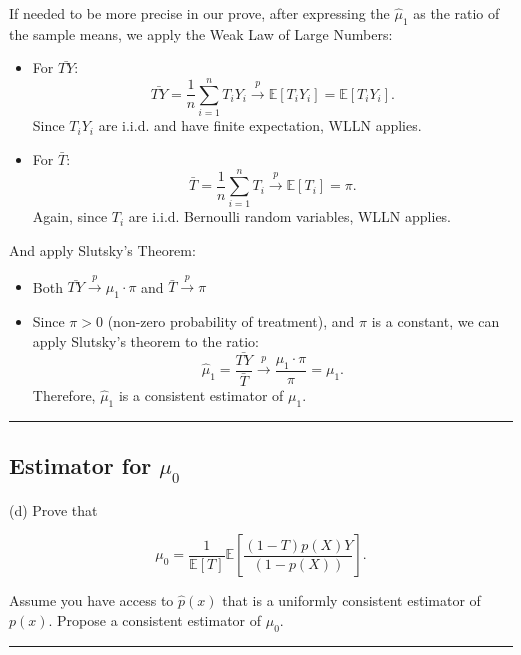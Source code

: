 \documentclass{article}
\newenvironment{colorparagraph}[1]{\par\color{#1}}{\par}
\begin{document}
If needed to be more precise in our prove, after expressing the $\hat{\mu}_1$ as the ratio of the sample means, we apply the Weak Law of Large Numbers:

\begin{itemize}
    \item For \(\bar{T Y}\):
    \[
    \bar{T Y} = \frac{1}{n} \sum_{i=1}^n T_i Y_i \xrightarrow{p} \mathbb{E}[T_i Y_i] = \mathbb{E}[T_i Y_i].
    \]
    Since \(T_i Y_i\) are i.i.d. and have finite expectation, WLLN applies.
    \item For \(\bar{T}\):
    \[
    \bar{T} = \frac{1}{n} \sum_{i=1}^n T_i \xrightarrow{p} \mathbb{E}[T_i] = \pi.
    \]
    Again, since \(T_i\) are i.i.d. Bernoulli random variables, WLLN applies.
\end{itemize}

And apply Slutsky's Theorem:

\begin{itemize}
    \item Both \(\bar{T Y} \xrightarrow{p} \mu_1 \cdot \pi\) and \(\bar{T} \xrightarrow{p} \pi\)
    \item Since \(\pi > 0\) (non-zero probability of treatment), and \(\pi\) is a constant, we can apply Slutsky's theorem to the ratio:
    \[
    \hat{\mu}_1 = \frac{\bar{T Y}}{\bar{T}} \xrightarrow{p} \frac{\mu_1 \cdot \pi}{\pi} = \mu_1.
    \]
    Therefore, \(\hat{\mu}_1\) is a consistent estimator of \(\mu_1\).
\end{itemize}

\begin{colorparagraph}{questioncolor}
\rule{\textwidth}{0.5pt}

\label{q2d}\subsection{Estimator for \( \mu_0 \)}
(d) Prove that 

\[
\mu_0 = \frac{1}{\mathbb{E}[T]} \mathbb{E} \left[ \frac{(1 - T)p(X)Y}{(1 - p(X))} \right].
\]

Assume you have access to \( \hat{p}(x) \) that is a uniformly consistent estimator of \( p(x) \). Propose a consistent estimator of \( \mu_0 \).

\rule{\textwidth}{0.5pt}
\end{colorparagraph}

\end{document}
